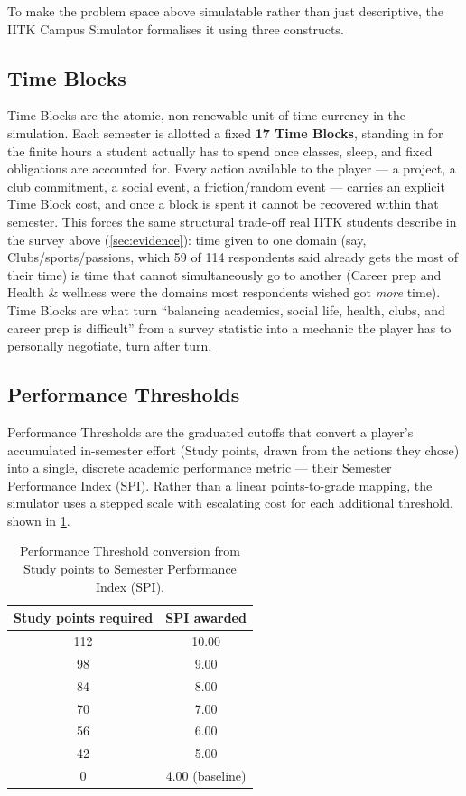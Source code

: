 To make the problem space above simulatable rather than just descriptive, the IITK Campus Simulator formalises it using three constructs.

\subsection*{Time Blocks}
\label{sec:time-blocks}

Time Blocks are the atomic, non-renewable unit of time-currency in the simulation. Each semester is allotted a fixed \textbf{17 Time Blocks}, standing in for the finite hours a student actually has to spend once classes, sleep, and fixed obligations are accounted for. Every action available to the player --- a project, a club commitment, a social event, a friction/random event --- carries an explicit Time Block cost, and once a block is spent it cannot be recovered within that semester. This forces the same structural trade-off real IITK students describe in the survey above (\cref{sec:evidence}): time given to one domain (say, Clubs/sports/passions, which 59 of 114 respondents said already gets the most of their time) is time that cannot simultaneously go to another (Career prep and Health \& wellness were the domains most respondents wished got \emph{more} time). Time Blocks are what turn ``balancing academics, social life, health, clubs, and career prep is difficult'' from a survey statistic into a mechanic the player has to personally negotiate, turn after turn.

\subsection*{Performance Thresholds}
\label{sec:performance-thresholds}

Performance Thresholds are the graduated cutoffs that convert a player's accumulated in-semester effort (Study points, drawn from the actions they chose) into a single, discrete academic performance metric --- their Semester Performance Index (SPI). Rather than a linear points-to-grade mapping, the simulator uses a stepped scale with escalating cost for each additional threshold, shown in \cref{tab:thresholds}.

\begin{table}[htbp]
  \centering
  \caption{Performance Threshold conversion from Study points to Semester Performance Index (SPI).}
  \label{tab:thresholds}
  \begin{tabular}{cc}
    \toprule
    \textbf{Study points required} & \textbf{SPI awarded} \\
    \midrule
    112 & 10.00 \\
    98  & 9.00  \\
    84  & 8.00  \\
    70  & 7.00  \\
    56  & 6.00  \\
    42  & 5.00  \\
    0   & 4.00 (baseline) \\
    \bottomrule
  \end{tabular}
\end{table}

